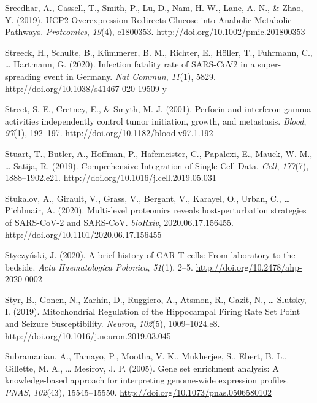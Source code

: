\documentclass[12pt,twoside,openany,\mydriver]{thesis}  %
\begin{document}
\leavevmode\hypertarget{ref-sreedhar_ucp2_2019}{}%
Sreedhar, A., Cassell, T., Smith, P., Lu, D., Nam, H. W., Lane, A. N., \& Zhao, Y. (2019). UCP2 Overexpression Redirects Glucose into Anabolic Metabolic Pathways. \emph{Proteomics}, \emph{19}(4), e1800353. \url{http://doi.org/10.1002/pmic.201800353}

\leavevmode\hypertarget{ref-streeck_infection_2020}{}%
Streeck, H., Schulte, B., Kümmerer, B. M., Richter, E., Höller, T., Fuhrmann, C., \ldots{} Hartmann, G. (2020). Infection fatality rate of SARS-CoV2 in a super-spreading event in Germany. \emph{Nat Commun}, \emph{11}(1), 5829. \url{http://doi.org/10.1038/s41467-020-19509-y}

\leavevmode\hypertarget{ref-street_perforin_2001}{}%
Street, S. E., Cretney, E., \& Smyth, M. J. (2001). Perforin and interferon-gamma activities independently control tumor initiation, growth, and metastasis. \emph{Blood}, \emph{97}(1), 192--197. \url{http://doi.org/10.1182/blood.v97.1.192}

\leavevmode\hypertarget{ref-stuart_comprehensive_2019}{}%
Stuart, T., Butler, A., Hoffman, P., Hafemeister, C., Papalexi, E., Mauck, W. M., \ldots{} Satija, R. (2019). Comprehensive Integration of Single-Cell Data. \emph{Cell}, \emph{177}(7), 1888--1902.e21. \url{http://doi.org/10.1016/j.cell.2019.05.031}

\leavevmode\hypertarget{ref-stukalov_multi-level_2020}{}%
Stukalov, A., Girault, V., Grass, V., Bergant, V., Karayel, O., Urban, C., \ldots{} Pichlmair, A. (2020). Multi-level proteomics reveals host-perturbation strategies of SARS-CoV-2 and SARS-CoV. \emph{bioRxiv}, 2020.06.17.156455. \url{http://doi.org/10.1101/2020.06.17.156455}

\leavevmode\hypertarget{ref-styczynski_brief_2020}{}%
Styczyński, J. (2020). A brief history of CAR-T cells: From laboratory to the bedside. \emph{Acta Haematologica Polonica}, \emph{51}(1), 2--5. \url{http://doi.org/10.2478/ahp-2020-0002}

\leavevmode\hypertarget{ref-styr_mitochondrial_2019}{}%
Styr, B., Gonen, N., Zarhin, D., Ruggiero, A., Atsmon, R., Gazit, N., \ldots{} Slutsky, I. (2019). Mitochondrial Regulation of the Hippocampal Firing Rate Set Point and Seizure Susceptibility. \emph{Neuron}, \emph{102}(5), 1009--1024.e8. \url{http://doi.org/10.1016/j.neuron.2019.03.045}

\leavevmode\hypertarget{ref-subramanian_gene_2005}{}%
Subramanian, A., Tamayo, P., Mootha, V. K., Mukherjee, S., Ebert, B. L., Gillette, M. A., \ldots{} Mesirov, J. P. (2005). Gene set enrichment analysis: A knowledge-based approach for interpreting genome-wide expression profiles. \emph{PNAS}, \emph{102}(43), 15545--15550. \url{http://doi.org/10.1073/pnas.0506580102}
\end{document}
